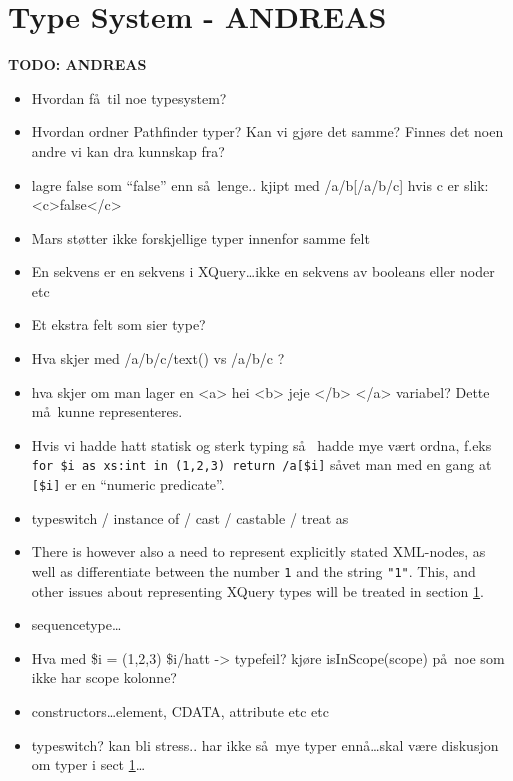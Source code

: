 \section{Type System - {ANDREAS}}
\label{sect:disc:typeSystem}
\textbf{\LARGE TODO: {ANDREAS}}
\begin{itemize}
  \item Hvordan f\aa~til noe typesystem?
  \item Hvordan ordner Pathfinder typer? Kan vi gj\o re det samme? Finnes det noen andre vi kan dra kunnskap fra?
  \item lagre false som ``false'' enn s\aa~lenge.. kjipt med /a/b[/a/b/c] hvis c er slik: <c>false</c>
  \item Mars st\o tter ikke forskjellige typer innenfor samme felt
  \item En sekvens er en sekvens i XQuery\ldots ikke en sekvens av booleans
  eller noder etc
  \item Et ekstra felt som sier type?
  \item Hva skjer med /a/b/c/text() vs /a/b/c ?
  \item hva skjer om man lager en <a> hei <b> jeje </b> </a> variabel? Dette
  m\aa~kunne representeres.
  \item Hvis vi hadde hatt statisk og sterk typing s\aa~ hadde mye v\ae rt
  ordna, f.eks \verb!for $i as xs:int in (1,2,3) return /a[$i]! s\aa vet man
  med en gang at \verb![$i]! er en ``numeric predicate''.
  \item typeswitch / instance of / cast / castable / treat as
  \item There is however also a need to represent explicitly stated XML-nodes, as well
	as differentiate between the number \texttt{1} and the string \texttt{"1"}.
	This, and other issues about representing XQuery types will be treated in
	section \ref{sect:disc:typeSystem}.
	\item sequencetype\ldots  
\item Hva med \$i = (1,2,3) \$i/hatt -> typefeil? kj\o re isInScope(scope) p\aa~noe som ikke har scope kolonne?
  		\item constructors\ldots element, CDATA, attribute etc etc
  		\item typeswitch? kan bli stress.. har ikke s\aa~mye typer enn\aa \ldots skal v\ae re diskusjon om typer i
  		sect \ref{sect:disc:typeSystem}\ldots
	\end{itemize}